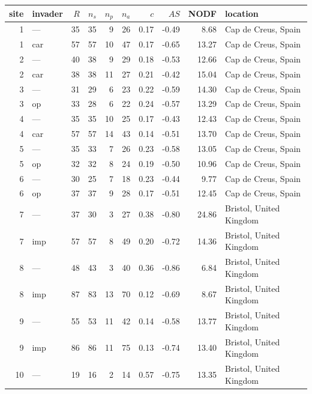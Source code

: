 \documentclass[a4paper]{artikel1}
\begin{document}
\begin{table}[ht]
\centering
\begin{tabular}{rlrrrrrrrl}
  \hline
site & invader & $R$ & $n_s$ & $n_p$ & $n_a$ & $c$ & $AS$ & NODF & location \\ 
  \hline
  1 & — &  35 &  35 &   9 &  26 & 0.17 & -0.49 & 8.68 & Cap de Creus, Spain \\ 
    1 & car &  57 &  57 &  10 &  47 & 0.17 & -0.65 & 13.27 & Cap de Creus, Spain \\ 
    2 & — &  40 &  38 &   9 &  29 & 0.18 & -0.53 & 12.66 & Cap de Creus, Spain \\ 
    2 & car &  38 &  38 &  11 &  27 & 0.21 & -0.42 & 15.04 & Cap de Creus, Spain \\ 
    3 & — &  31 &  29 &   6 &  23 & 0.22 & -0.59 & 14.30 & Cap de Creus, Spain \\ 
    3 & op &  33 &  28 &   6 &  22 & 0.24 & -0.57 & 13.29 & Cap de Creus, Spain \\ 
    4 & — &  35 &  35 &  10 &  25 & 0.17 & -0.43 & 12.43 & Cap de Creus, Spain \\ 
    4 & car &  57 &  57 &  14 &  43 & 0.14 & -0.51 & 13.70 & Cap de Creus, Spain \\ 
    5 & — &  35 &  33 &   7 &  26 & 0.23 & -0.58 & 13.05 & Cap de Creus, Spain \\ 
    5 & op &  32 &  32 &   8 &  24 & 0.19 & -0.50 & 10.96 & Cap de Creus, Spain \\ 
    6 & — &  30 &  25 &   7 &  18 & 0.23 & -0.44 & 9.77 & Cap de Creus, Spain \\ 
    6 & op &  37 &  37 &   9 &  28 & 0.17 & -0.51 & 12.45 & Cap de Creus, Spain \\ 
    7 & — &  37 &  30 &   3 &  27 & 0.38 & -0.80 & 24.86 & Bristol, United Kingdom \\ 
    7 & imp &  57 &  57 &   8 &  49 & 0.20 & -0.72 & 14.36 & Bristol, United Kingdom \\ 
    8 & — &  48 &  43 &   3 &  40 & 0.36 & -0.86 & 6.84 & Bristol, United Kingdom \\ 
    8 & imp &  87 &  83 &  13 &  70 & 0.12 & -0.69 & 8.67 & Bristol, United Kingdom \\ 
    9 & — &  55 &  53 &  11 &  42 & 0.14 & -0.58 & 13.77 & Bristol, United Kingdom \\ 
    9 & imp &  86 &  86 &  11 &  75 & 0.13 & -0.74 & 13.40 & Bristol, United Kingdom \\ 
   10 & — &  19 &  16 &   2 &  14 & 0.57 & -0.75 & 13.35 & Bristol, United Kingdom \\ 

\end{tabular}
\end{table}
\end{document}
